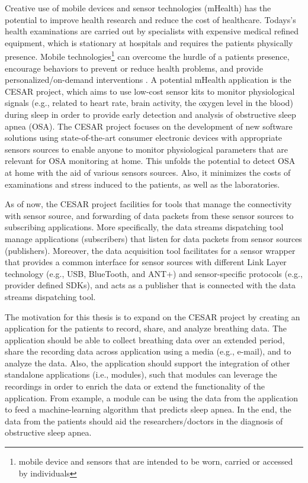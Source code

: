 Creative use of mobile devices and sensor technologies (mHealth) has the potential to improve health research and reduce the cost of healthcare. Todays's health examinations are carried out by specialists with expensive medical refined equipment, which is stationary at hospitals and requires the patients physically presence.  Mobile technologies\footnote{mobile device and sensors that are intended to be worn, carried or accessed by individuals} can overcome the hurdle of a patients presence, encourage behaviors to prevent or reduce health problems, and provide personalized/on-demand interventions \cite{kumar2013mobile}. A potential mHealth application is the CESAR project, which aims to use low-cost sensor kits to monitor physiological signals (e.g., related to heart rate, brain activity, the oxygen level in the blood) during sleep in order to provide early detection and analysis of obstructive sleep apnea (OSA). The CESAR project \cite{cesar} focuses on the development of new software solutions using state-of-the-art consumer electronic devices with appropriate sensors sources to enable anyone to monitor physiological parameters that are relevant for OSA monitoring at home. This unfolds the potential to detect OSA at home with the aid of various sensors sources. Also, it minimizes the costs of examinations and stress induced to the patients, as well as the laboratories. 

As of now, the CESAR project facilities for tools that manage the connectivity with sensor source, and forwarding of data packets from these sensor sources to subscribing applications. More specifically, the data streams dispatching tool \cite{daniel} manage applications (subscribers) that listen for data packets from sensor sources (publishers). Moreover, the data acquisition tool \cite{gjoby} facilitates for a sensor wrapper that provides a common interface for sensor sources with different Link Layer technology (e.g., USB, BlueTooth, and ANT+) and sensor-specific protocols (e.g., provider defined SDKs), and acts as a publisher that is connected with the data streams dispatching tool. 

The motivation for this thesis is to expand on the CESAR project by creating an application for the patients to record, share, and analyze breathing data. The application should be able to collect breathing data over an extended period, share the recording data across application using a media (e.g., e-mail), and to analyze the data. Also, the application should support the integration of other standalone applications (i.e., modules), such that modules can leverage the recordings in order to enrich the data or extend the functionality of the application. From example, a module can be using the data from the application to feed a machine-learning algorithm that predicts sleep apnea. In the end, the data from the patients should aid the researchers/doctors in the diagnosis of obstructive sleep apnea.  